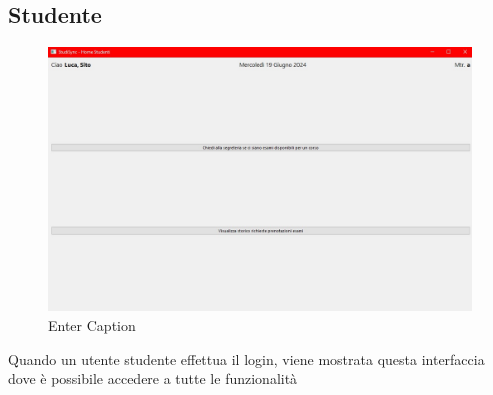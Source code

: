 \documentclass{article}
\begin{document}
\subsection{Studente}
\begin{figure}
    \centering
    \includegraphics[width=1\linewidth]{IMG/studentehome.jpg}
    \caption{Enter Caption}
    \label{fig:enter-label}
\end{figure}
Quando un utente studente effettua il login, viene mostrata questa interfaccia dove è possibile accedere a tutte le funzionalità
\newpage
\end{document}
